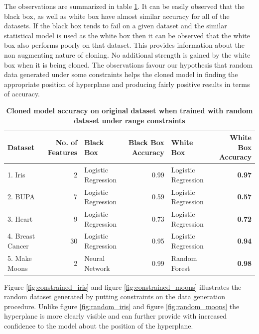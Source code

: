 \documentclass[9pt,twocolumn,twoside]{pnas-new}
\begin{document}
The observations are summarized in table \ref{table:2}. It can be easily observed that the black box, as well as white box have almost similar accuracy for all of the datasets. If the black box tends to fail on a given dataset and the similar statistical model is used as the white box then it can be observed that the white box also performs poorly on that dataset. This provides information about the non augmenting nature of cloning. No additional strength is gained by the white box when it is being cloned. The observations favour our hypothesis that random data generated under some constraints helps the cloned model in finding the appropriate position of hyperplane and producing fairly positive results in terms of accuracy.\\

\begin{table}
  	\centering
  	\caption{\textbf{Cloned model accuracy on original dataset when trained with random dataset under range constraints}}
	\begin{tabular}{lrlrlr}
		Dataset & No. of Features & Black Box & Black Box Accuracy & White Box & White Box Accuracy \\
	\midrule
		1. Iris & 2 & Logistic Regression & 0.99 & Logistic Regression & \textbf{0.97} \\
		2. BUPA & 7 & Logistic Regression & 0.59 & Logistic Regression & \textbf{0.57} \\
		3. Heart & 9 & Logistic Regression & 0.73 & Logistic Regression & \textbf{0.72} \\
		4. Breast Cancer & 30 & Logistic Regression & 0.95 & Logistic Regression & \textbf{0.94} \\
		5. Make Moons & 2 & Neural Network & 0.99 & Random Forest & \textbf{0.98} \\
	\bottomrule
	\end{tabular}
  	\label{table:2}
\end{table}

Figure \ref{fig:constrained_iris} and figure \ref{fig:constrained_moons} illustrates the random dataset generated by putting constraints on the data generation procedure. Unlike figure \ref{fig:random_iris} and figure \ref{fig:random_moons} the hyperplane is more clearly visible and can further provide with increased confidence to the model about the position of the hyperplane.
\end{document}
